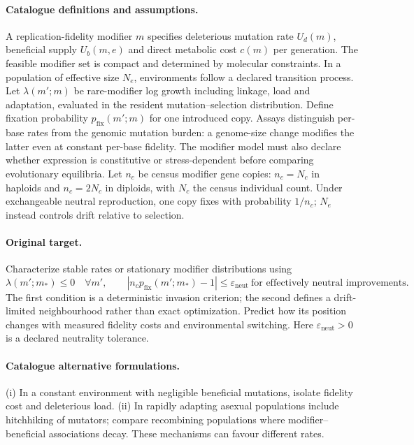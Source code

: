\documentclass[11pt]{article}
\begin{document}
\paragraph{Catalogue definitions and assumptions.}
A replication-fidelity modifier $m$ specifies deleterious mutation rate $U_d(m)$, beneficial supply $U_b(m,e)$ and direct metabolic cost $c(m)$ per generation. The feasible modifier set is compact and determined by molecular constraints. In a population of effective size $N_e$, environments follow a declared transition process. Let $\lambda(m';m)$ be rare-modifier log growth including linkage, load and adaptation, evaluated in the resident mutation--selection distribution. Define fixation probability $p_{\mathrm{fix}}(m';m)$ for one introduced copy. Assays distinguish per-base rates from the genomic mutation burden: a genome-size change modifies the latter even at constant per-base fidelity. The modifier model must also declare whether expression is constitutive or stress-dependent before comparing evolutionary equilibria. Let $n_c$ be census modifier gene copies: $n_c=N_c$ in haploids and $n_c=2N_c$ in diploids, with $N_c$ the census individual count. Under exchangeable neutral reproduction, one copy fixes with probability $1/n_c$; $N_e$ instead controls drift relative to selection.
\paragraph{Original target.}
Characterize stable rates or stationary modifier distributions using
\[
 \lambda(m';m_*)\le0\quad\forall m',
 \qquad
 |n_c p_{\mathrm{fix}}(m';m_*)-1|\le\varepsilon_{\mathrm{neut}}
 \ \text{for effectively neutral improvements}.
\]
The first condition is a deterministic invasion criterion; the second defines a drift-limited neighbourhood rather than exact optimization. Predict how its position changes with measured fidelity costs and environmental switching. Here $\varepsilon_{\mathrm{neut}}>0$ is a declared neutrality tolerance.
\paragraph{Catalogue alternative formulations.}
(i) In a constant environment with negligible beneficial mutations, isolate fidelity cost and deleterious load. (ii) In rapidly adapting asexual populations include hitchhiking of mutators; compare recombining populations where modifier--beneficial associations decay. These mechanisms can favour different rates.
\end{document}
